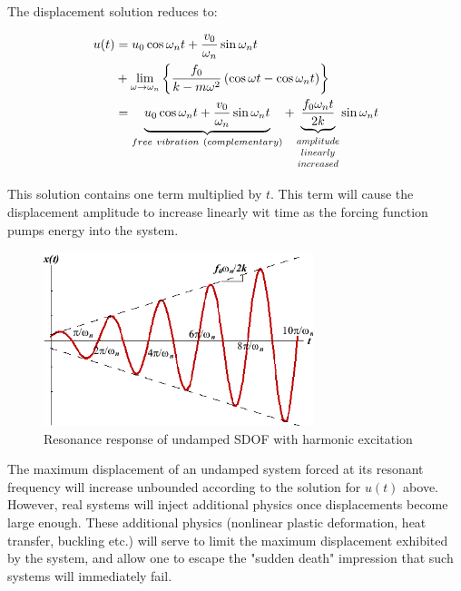 \documentclass[10pt,b5paper,titlepage]{book}
\newcommand*{\Scale}[2][4]{\scalebox{#1}{$#2$}}%
\newenvironment{eqarray}
{
    \begin{eqnarray}
        \begin{aligned}
}
{
        \end{aligned}
    \end{eqnarray}
}
\begin{document}
The displacement solution reduces to:

\begin{eqarray}
    u(t) &= u_0 \cos{\omega_n t} + \frac{v_0}{\omega_n} \sin{\omega_n t}\\
         &+ \lim_{\omega \rightarrow \omega_n} \left\{
             \frac{f_0}{k - m \omega^2} \left(
                 \cos{\omega t} - \cos{\omega_n t}
                 \right)
         \right\}\\
         &= \underbrace{u_0 \cos{\omega_n t} + \frac{v_0}{\omega_n} \sin{\omega_n t}}_{
         free\ vibration\ (complementary)}
         + \underbrace{\frac{f_0 \omega_n t}{2 k}}_{\Scale[0.75]{
             \begin{matrix}
                 amplitude\\
                 linearly\\
                 increased
             \end{matrix}}}
         \sin{\omega_n t}
\end{eqarray}

This solution contains one term multiplied by $ t $. This term will cause the displacement
amplitude to increase linearly wit time as the forcing function pumps energy into
the system.

\begin{figure}[ht]
    \centering
    \includegraphics[width=0.70\textwidth]{img/SDOF_Undamped_Harmonic_Response.png}
    \caption{Resonance response of undamped SDOF with harmonic excitation}
    \label{fig:SDOF-undamped-harmonic-response-png}
\end{figure}

The maximum displacement of an undamped system forced at its resonant frequency will
increase unbounded according to the solution for $ u(t) $ above. However, real systems
will inject additional physics once displacements become large enough. These
additional physics (nonlinear plastic deformation, heat transfer, buckling etc.) will
serve to limit the maximum displacement exhibited by the system, and allow one to escape
the "sudden death" impression that such systems will immediately fail.
\end{document}
